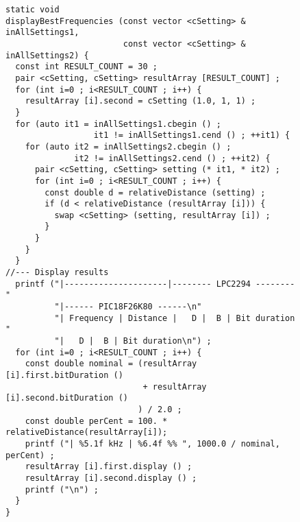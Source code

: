 \begin{figure}[!ht]
\begin{lstlisting}
static void
displayBestFrequencies (const vector <cSetting> & inAllSettings1,
                        const vector <cSetting> & inAllSettings2) {
  const int RESULT_COUNT = 30 ;
  pair <cSetting, cSetting> resultArray [RESULT_COUNT] ;
  for (int i=0 ; i<RESULT_COUNT ; i++) {
    resultArray [i].second = cSetting (1.0, 1, 1) ;
  }
  for (auto it1 = inAllSettings1.cbegin () ;
                  it1 != inAllSettings1.cend () ; ++it1) {
    for (auto it2 = inAllSettings2.cbegin () ;
              it2 != inAllSettings2.cend () ; ++it2) {
      pair <cSetting, cSetting> setting (* it1, * it2) ;
      for (int i=0 ; i<RESULT_COUNT ; i++) {
        const double d = relativeDistance (setting) ;
        if (d < relativeDistance (resultArray [i])) {
          swap <cSetting> (setting, resultArray [i]) ;
        }
      }
    }
  }
//--- Display results
  printf ("|---------------------|-------- LPC2294 --------"
          "|------ PIC18F26K80 ------\n"
          "| Frequency | Distance |   D |  B | Bit duration "
          "|   D |  B | Bit duration\n") ;
  for (int i=0 ; i<RESULT_COUNT ; i++) {
    const double nominal = (resultArray [i].first.bitDuration ()
                            + resultArray [i].second.bitDuration ()
                           ) / 2.0 ;
    const double perCent = 100. * relativeDistance(resultArray[i]);
    printf ("| %5.1f kHz | %6.4f %% ", 1000.0 / nominal, perCent) ;
    resultArray [i].first.display () ;
    resultArray [i].second.display () ;
    printf ("\n") ;
  }
}
\end{lstlisting}
\end{figure}






